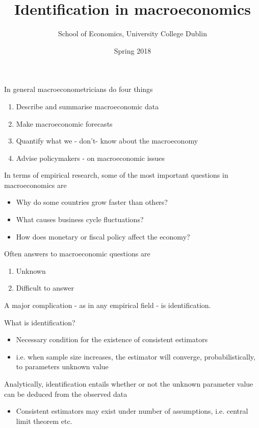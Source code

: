\documentclass{beamer}
\title{Identification in macroeconomics}
\author{School of Economics, University College Dublin}
\date{Spring 2018}
\begin{document}
\begin{frame}
 \titlepage
\end{frame}

\begin{frame}
  In general macroeconometricians do four things
  \begin{enumerate}
    \item Describe and summarise macroeconomic data
    \item Make macroeconomic forecasts
    \item Quantify what we - don't- know about the macroeconomy
    \item Advise policymakers - on macroeconomic issues
  \end{enumerate}
\end{frame}

\begin{frame}
 In terms of empirical research, some of the most important questions in macroeconomics are  
  \begin{itemize}
    \item Why do some countries grow faster than others?
    \medskip
    \item What causes business cycle fluctuations?
    \item How does monetary or fiscal policy affect the economy?    
  \end{itemize}    
\end{frame}

\begin{frame}
  Often answers to macroeconomic questions are 
  \begin{enumerate}
    \item Unknown
    \item Difficult to answer
  \end{enumerate}
  \medskip
  A major complication - as in any empirical field - is identification.
\end{frame}

\begin{frame}
  What is identification?
  \begin{itemize}
    \item Necessary condition for the existence of consistent estimators
    \item i.e. when sample size increases, the estimator will converge, probabilistically, to parameters unknown value
  \end{itemize}
  \medskip
  Analytically, identification entails whether or not the unknown parameter value can be deduced from the observed data
  \begin{itemize}
    \item Consistent estimators may exist under number of assumptions, i.e. central limit theorem etc.
  \end{itemize}
\end{frame}
\end{document}
